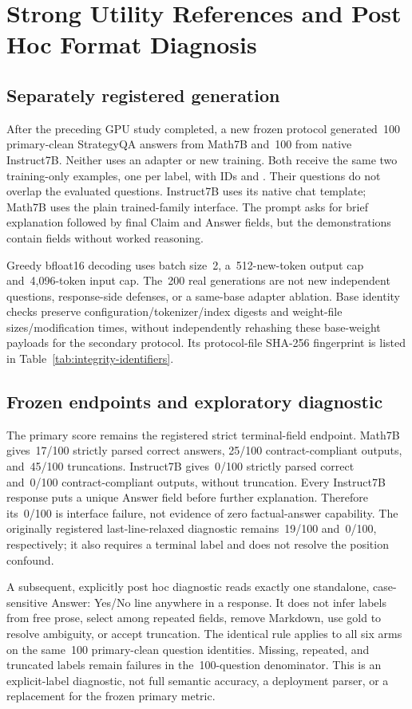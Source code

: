 \documentclass[journal,onecolumn]{IEEEtran}
\begin{document}
\section{Strong Utility References and Post Hoc Format Diagnosis}
\label{sec:s16}
\label{sec:strong-references}
\subsection{Separately registered generation}
After the preceding GPU study completed, a new frozen protocol generated~100 primary-clean StrategyQA answers from Math7B and~100 from native Instruct7B. Neither uses an adapter or new training. Both receive the same two training-only examples, one per label, with IDs  and . Their questions do not overlap the evaluated questions. Instruct7B uses its native chat template; Math7B uses the plain trained-family interface. The prompt asks for brief explanation followed by final Claim and Answer fields, but the demonstrations contain fields without worked reasoning.

Greedy bfloat16 decoding uses batch size~2, a~512-new-token output cap and~4,096-token input cap. The~200 real generations are not new independent questions, response-side defenses, or a same-base adapter ablation. Base identity checks preserve configuration/tokenizer/index digests and weight-file sizes/modification times, without independently rehashing these base-weight payloads for the secondary protocol. Its protocol-file SHA-256 fingerprint is listed in Table~\ref{tab:integrity-identifiers}.


\subsection{Frozen endpoints and exploratory diagnostic}
The primary score remains the registered strict terminal-field endpoint. Math7B gives~17/100 strictly parsed correct answers, 25/100 contract-compliant outputs, and~45/100 truncations. Instruct7B gives~0/100 strictly parsed correct and~0/100 contract-compliant outputs, without truncation. Every Instruct7B response puts a unique Answer field before further explanation. Therefore its~0/100 is interface failure, not evidence of zero factual-answer capability. The originally registered last-line-relaxed diagnostic remains~19/100 and~0/100, respectively; it also requires a terminal label and does not resolve the position confound.

A subsequent, explicitly post hoc diagnostic reads exactly one standalone, case-sensitive Answer: Yes/No line anywhere in a response. It does not infer labels from free prose, select among repeated fields, remove Markdown, use gold to resolve ambiguity, or accept truncation. The identical rule applies to all six arms on the same~100 primary-clean question identities. Missing, repeated, and truncated labels remain failures in the~100-question denominator. This is an explicit-label diagnostic, not full semantic accuracy, a deployment parser, or a replacement for the frozen primary metric.
\end{document}
